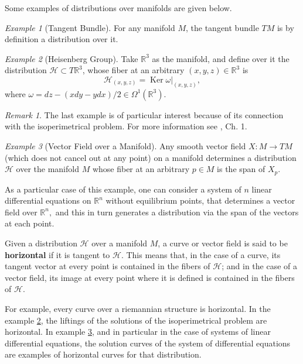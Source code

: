 \documentclass[12pt, letterpaper, reqno]{amsart}
\theoremstyle{definition}
\theoremstyle{plain}
\theoremstyle{remark}
\newtheorem{ex}{Example}
\newtheorem{rem}{Remark}
\begin{document}
Some examples of distributions over manifolds are given below.
\begin{ex}[Tangent Bundle]
	For any manifold $ M $, the tangent bundle $ TM $ is by definition a distribution over it. 
\end{ex}
\begin{ex}[Heisenberg Group]\label{ex:heis_group}
	Take $ \mathbb{R} ^3 $ as the manifold, and define over it the distribution $ \mathcal{H}\subset T \mathbb{R} ^3 $, whose fiber at an arbitrary $ (x,y,z)\in \mathbb{R}^3  $ is   
	$$ \mathcal{H}_{(x,y,z)} = \operatorname{Ker} \omega|_{(x,y,z)},$$
	where $ \omega = dz-(x dy-y dx)/2\in\Omega^1( \mathbb{R}^3).$ 
\end{ex}
\begin{rem}
	The last example is of particular interest because of its connection with the isoperimetrical problem. For more information see \cite{montgomery2002tour}, Ch. 1.
\end{rem}
\begin{ex}[Vector Field over a Manifold]\label{ex:vect_field}
	Any smooth vector field $ X: M \rightarrow {TM} $ (which does not cancel out at any point) on a manifold determines a distribution $ \mathcal{H}$ over the manifold $ M $ whose fiber at an arbitrary $ p\in M $ is the span of $ X_p. $

	As a particular case of this example, one can consider a system of $ n $ linear differential equations on $ \mathbb{R}^n $ without equilibrium points, that determines a vector field over $ \mathbb{R}^n,  $ and this in turn generates a distribution via the span of the vectors at each point.
\end{ex}


Given a distribution $ \mathcal{H} $  over a manifold $M$,  a curve or vector field is said to be \textbf{horizontal} if it is tangent to $ \mathcal{H} $. This means that, in the case of a curve, its tangent vector at every point is contained in the fibers of $ \mathcal{H} $; and in the case of a vector field, its image at every point where it is defined is contained in the fibers of $ \mathcal{H} .$   

For example, every curve over a riemannian structure is horizontal. In the example \ref{ex:heis_group}, the liftings of the solutions of the isoperimetrical problem are horizontal. In example \ref{ex:vect_field}, and in particular in the case of systems of linear differential equations, the solution curves of the system of differential equations are examples of horizontal curves for that distribution.
\end{document}
